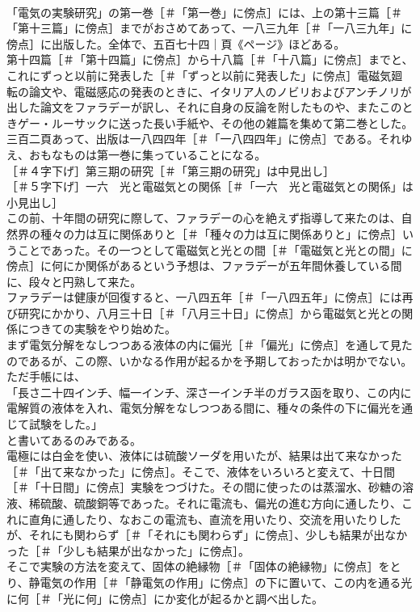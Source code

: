 \documentclass[8pt]{extreport}
\begin{document}
\begin{CJK}{UTF8}{min}
\\	「電気の実験研究」の第一巻［＃「第一巻」に傍点］には、上の第十三篇［＃「第十三篇」に傍点］までがおさめてあって、一八三九年［＃「一八三九年」に傍点］に出版した。全体で、五百七十四｜頁《ページ》ほどある。
\\	第十四篇［＃「第十四篇」に傍点］から十八篇［＃「十八篇」に傍点］までと、これにずっと以前に発表した［＃「ずっと以前に発表した」に傍点］電磁気廻転の論文や、電磁感応の発表のときに、イタリア人のノビリおよびアンチノリが出した論文をファラデーが訳し、それに自身の反論を附したものや、またこのときゲー・ルーサックに送った長い手紙や、その他の雑篇を集めて第二巻とした。三百二頁あって、出版は一八四四年［＃「一八四四年」に傍点］である。それゆえ、おもなものは第一巻に集っていることになる。
\\	［＃４字下げ］第三期の研究［＃「第三期の研究」は中見出し］
\\	［＃５字下げ］一六　光と電磁気との関係［＃「一六　光と電磁気との関係」は小見出し］
\\	この前、十年間の研究に際して、ファラデーの心を絶えず指導して来たのは、自然界の種々の力は互に関係ありと［＃「種々の力は互に関係ありと」に傍点］いうことであった。その一つとして電磁気と光との間［＃「電磁気と光との間」に傍点］に何にか関係があるという予想は、ファラデーが五年間休養している間に、段々と円熟して来た。
\\	ファラデーは健康が回復すると、一八四五年［＃「一八四五年」に傍点］には再び研究にかかり、八月三十日［＃「八月三十日」に傍点］から電磁気と光との関係につきての実験をやり始めた。
\\	まず電気分解をなしつつある液体の内に偏光［＃「偏光」に傍点］を通して見たのであるが、この際、いかなる作用が起るかを予期しておったかは明かでない。ただ手帳には、
\\	「長さ二十四インチ、幅一インチ、深さ一インチ半のガラス函を取り、この内に電解質の液体を入れ、電気分解をなしつつある間に、種々の条件の下に偏光を通じて試験をした。」
\\	と書いてあるのみである。
\\	電極には白金を使い、液体には硫酸ソーダを用いたが、結果は出て来なかった［＃「出て来なかった」に傍点］。そこで、液体をいろいろと変えて、十日間［＃「十日間」に傍点］実験をつづけた。その間に使ったのは蒸溜水、砂糖の溶液、稀硫酸、硫酸銅等であった。それに電流も、偏光の進む方向に通したり、これに直角に通したり、なおこの電流も、直流を用いたり、交流を用いたりしたが、それにも関わらず［＃「それにも関わらず」に傍点］、少しも結果が出なかった［＃「少しも結果が出なかった」に傍点］。
\\	そこで実験の方法を変えて、固体の絶縁物［＃「固体の絶縁物」に傍点］をとり、静電気の作用［＃「静電気の作用」に傍点］の下に置いて、この内を通る光に何［＃「光に何」に傍点］にか変化が起るかと調べ出した。

\end{CJK}
\end{document}

